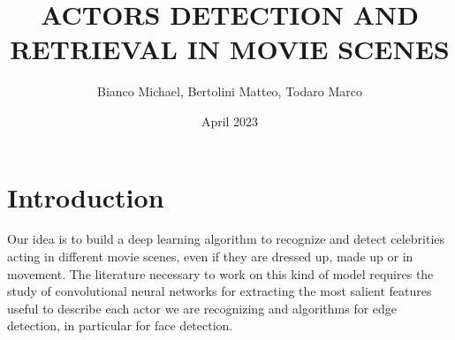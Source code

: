 \documentclass{article}
\title{ACTORS DETECTION AND RETRIEVAL IN MOVIE SCENES}
\author{Bianco Michael, Bertolini Matteo, Todaro Marco}
\date{April 2023}
\begin{document}
\maketitle
\section{Introduction}

Our idea is to build a deep learning algorithm to recognize and detect celebrities acting in different 
movie scenes, 
even if they are dressed up, made up or in movement.
The literature necessary to work on this kind of model requires the study of convolutional neural networks
for extracting the most salient features useful to describe each actor we are recognizing and algorithms for edge
detection, in particular for face detection.
\end{document}

